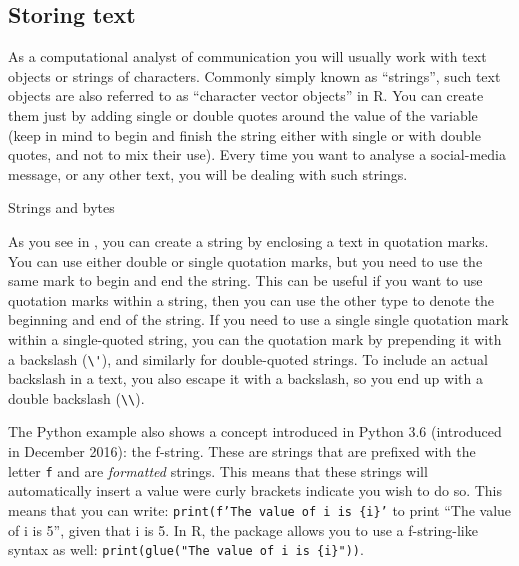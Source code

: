 



\subsection{Storing text}

As a computational analyst of communication you will usually work with
text objects or strings of characters. Commonly simply known as ``strings'',
such text objects are also referred to as ``character vector objects'' in R.
You can create them just by adding single or double quotes around the value of the variable (keep in mind to begin and finish the string either with single or with double quotes, and not to mix their use). Every time you want to analyse a social-media message, or any other text, you will be dealing with such strings. 

\begin{ccsexample}
  \caption{Strings and bytes}\label{ex:var4}
 \end{ccsexample}

As you see in , you can create a string by enclosing a text in quotation
marks. You can use either double or single quotation marks, but you
need to use the same mark to begin and end the string. This can be
useful if you want to use quotation marks within a string, then you can
use the other type to denote the beginning and end of the string.
If you need to use a single single quotation mark within a single-quoted string,
you can  the quotation mark by prepending it with a backslash (\verb|\'|),
and similarly for double-quoted strings.
To include an actual backslash in a text, you also escape it with a backslash,
so you end up with a double backslash (\verb|\\|). 

The Python example also shows a concept introduced in Python 3.6 (introduced in December 2016):
the f-string.  These are strings that are prefixed with the letter \texttt{f} and are \emph{formatted} strings. This means that these strings will automatically insert a value were curly brackets indicate you wish to do so. This means that you can write: \texttt{print(f'The value of i is \{i\}'} to print ``The value of i is 5'', given that i is 5.
In R, the  package allows you to use a f-string-like syntax as well: \texttt{print(glue("The value of i is \{i\}"))}.

